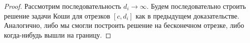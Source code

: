 \documentclass[document.tex]{subfiles}
\begin{document}
\begin{proof}
    Рассмотрим последовательность $d_i \rightarrow \infty$. Будем последовательно строить решение задачи Коши для
    отрезков $[c, d_i]$ как в предыдущем доказательстве. Аналогично, либо мы смогли построить решение на бесконечном
    отрезке, либо когда-нибудь вышли на границу.
\end{proof}
\end{document}
